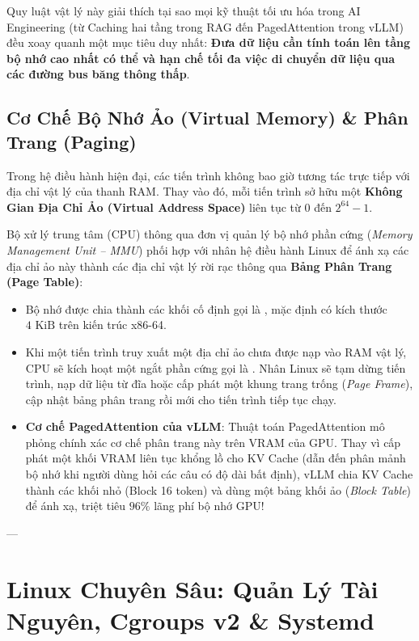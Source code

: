 Quy luật vật lý này giải thích tại sao mọi kỹ thuật tối ưu hóa trong AI Engineering (từ Caching hai tầng trong RAG đến PagedAttention trong vLLM) đều xoay quanh một mục tiêu duy nhất: \textbf{Đưa dữ liệu cần tính toán lên tầng bộ nhớ cao nhất có thể và hạn chế tối đa việc di chuyển dữ liệu qua các đường bus băng thông thấp}.

\subsection{Cơ Chế Bộ Nhớ Ảo (Virtual Memory) \& Phân Trang (Paging)}
Trong hệ điều hành hiện đại, các tiến trình không bao giờ tương tác trực tiếp với địa chỉ vật lý của thanh RAM. Thay vào đó, mỗi tiến trình sở hữu một \textbf{Không Gian Địa Chỉ Ảo (Virtual Address Space)} liên tục từ $0$ đến $2^{64}-1$.

Bộ xử lý trung tâm (CPU) thông qua đơn vị quản lý bộ nhớ phần cứng (\textit{Memory Management Unit -- MMU}) phối hợp với nhân hệ điều hành Linux để ánh xạ các địa chỉ ảo này thành các địa chỉ vật lý rời rạc thông qua \textbf{Bảng Phân Trang (Page Table)}:
\begin{itemize}
  \item Bộ nhớ được chia thành các khối cố định gọi là , mặc định có kích thước $4\text{ KiB}$ trên kiến trúc x86-64.
  \item Khi một tiến trình truy xuất một địa chỉ ảo chưa được nạp vào RAM vật lý, CPU sẽ kích hoạt một ngắt phần cứng gọi là . Nhân Linux sẽ tạm dừng tiến trình, nạp dữ liệu từ đĩa hoặc cấp phát một khung trang trống (\textit{Page Frame}), cập nhật bảng phân trang rồi mới cho tiến trình tiếp tục chạy.
  \item \textbf{Cơ chế PagedAttention của vLLM}: Thuật toán PagedAttention mô phỏng chính xác cơ chế phân trang này trên VRAM của GPU. Thay vì cấp phát một khối VRAM liên tục khổng lồ cho KV Cache (dẫn đến phân mảnh bộ nhớ khi người dùng hỏi các câu có độ dài bất định), vLLM chia KV Cache thành các khối nhỏ (Block 16 token) và dùng một bảng khối ảo (\textit{Block Table}) để ánh xạ, triệt tiêu $96\%$ lãng phí bộ nhớ GPU!
\end{itemize}

---

\section{Linux Chuyên Sâu: Quản Lý Tài Nguyên, Cgroups v2 \& Systemd}
\label{sec:linux-internals}

